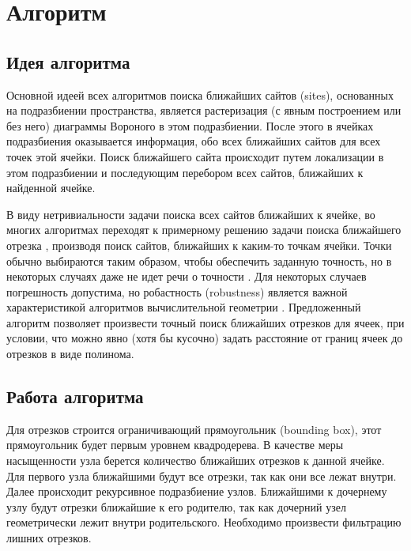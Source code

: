 \FloatBarrier
\section{Алгоритм}
\subsection{Идея алгоритма}
Основной идеей всех алгоритмов поиска ближайших сайтов (sites),
основанных на подразбиении пространства, является растеризация (с явным
построением или без него) диаграммы Вороного в этом подразбиении. После
этого в ячейках подразбиения оказывается информация, обо всех ближайших
сайтов для всех точек этой ячейки. Поиск ближайшего сайта происходит
путем локализации в этом подразбиении и последующим перебором всех
сайтов, ближайших к найденной ячейке.

В виду нетривиальности задачи поиска всех сайтов ближайших к ячейке,
во многих алгоритмах переходят к примерному решению задачи поиска
ближайшего отрезка \cite{NGRID}, производя поиск сайтов, ближайших к каким-то
точкам ячейки. Точки обычно выбираются таким образом, чтобы обеспечить
заданную точность, но в некоторых случаях даже не идет речи о точности \cite{AVOR}.
Для некоторых случаев погрешность допустима, но робастность (robustness)
является важной характеристикой алгоритмов вычислительной геометрии \cite{ROBUS}.
Предложенный алгоритм позволяет произвести точный поиск ближайших
отрезков для ячеек, при условии, что можно явно (хотя бы кусочно) задать
расстояние от границ ячеек до отрезков в виде полинома.

\FloatBarrier
\subsection{Работа алгоритма}

Для отрезков строится ограничивающий прямоугольник (bounding box), этот прямоугольник будет первым
уровнем квадродерева. В качестве меры насыщенности узла берется количество
ближайших отрезков к данной ячейке. Для первого узла ближайшими будут все
отрезки, так как они все лежат внутри. Далее происходит рекурсивное
подразбиение узлов. Ближайшими к дочернему узлу будут отрезки ближайшие
к его родителю, так как дочерний узел геометрически лежит внутри
родительского. Необходимо произвести фильтрацию лишних отрезков.

